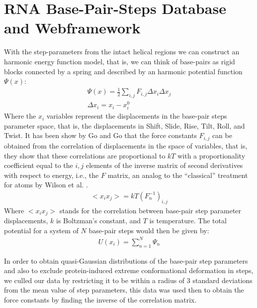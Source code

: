 


\section{RNA Base-Pair-Steps Database and Webframework}
With the step-parameters from the intact helical regions we can
construct an harmonic energy function model, that is, we can think of
base-pairs  as  rigid  blocks  connected  by a spring  and
described by an harmonic potential function $\Psi(x)$:
\begin{gather}
\Psi (x) = \frac{1}{2}\sum_{i,j} F_{i,j} \Delta x_{i} \Delta x_{j}\\
\Delta x_{i}=x_{i}-x_{i}^{0}
\end{gather}  
Where  the  $x_{i}$  variables  represent  the  displacements  in  the
base-pair steps parameter space,  that is, the displacements in Shift,
Slide, Rise,  Tilt, Roll,  and Twist. It  has been  show by Go  and Go
\cite{go1976} that the force  constants $F_{i,j}$ can be obtained from
the correlation of  displacements in the space of  variables, that is,
they show that these correlations are proportional to $kT$ with a
proportionality coefficient equal to the $i,j$ elements of the inverse
matrix of  second derivatives  with respect to  energy, i.e.,   the $F$
matrix, an analog to the ``classical'' treatment for atoms by Wilson et
al. \cite{wilson1955}.
\begin{gather}
<x_i x_j> = kT (F_{n}^{-1})_{i,j}
\end{gather}
Where $<x_i  x_j>$ stands for  the correlation between  base-pair step
parameter  displacements,  $k$  is  Boltzman's constant,  and  $T$  is
temperature. The total potential for a system of $N$ base-pair steps would
then be given by:
\begin{gather}
U(x_{i}) = \sum_{n=1}^{N} \Psi_{n}
\end{gather}

In order to obtain  quasi-Gaussian distributions of the base-pair step
parameters and also  to exclude protein-induced extreme conformational
deformation  in steps,  we culled  our data  by restricting  it  to be
within a radius  of 3 standard deviations from the  mean value of step
parameters, this data  was used then to obtain  the force constants by
finding the inverse of the correlation matrix.

